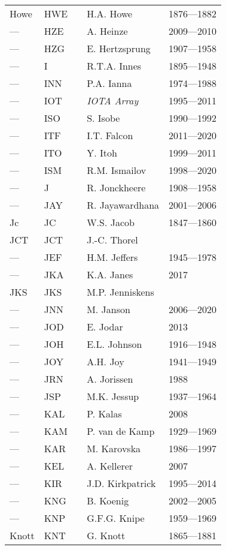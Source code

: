 \begin{longtable}{l|l|c|p{59mm}|l}
Howe & HWE &   & H.A. Howe & 1876---1882 \\
--- & HZE &   & A. Heinze & 2009---2010 \\
--- & HZG &   & E. Hertzsprung & 1907---1958 \\\midrule
--- & I   &   & R.T.A. Innes & 1895---1948 \\
--- & INN &   & P.A. Ianna & 1974---1988 \\
--- & IOT &   & \emph{IOTA Array} & 1995---2011 \\
--- & ISO &   & S. Isobe & 1990---1992 \\
--- & ITF &   & I.T. Falcon & 2011---2020 \\
--- & ITO &   & Y. Itoh & 1999---2011 \\
--- & ISM &   & R.M. Ismailov & 1998---2020 \\\midrule
--- & J   &   & R. Jonckheere & 1908---1958 \\
--- & JAY &   & R. Jayawardhana & 2001---2006 \\
Jc  & JC  &   & W.S. Jacob & 1847---1860 \\
JCT & JCT &   & J.-C. Thorel & \\
--- & JEF &   & H.M. Jeffers & 1945---1978 \\
--- & JKA &   & K.A. Janes & 2017 \\
JKS & JKS &   & M.P. Jenniskens & \\
--- & JNN &   & M. Janson & 2006---2020 \\
--- & JOD &   & E. Jodar & 2013 \\
--- & JOH &   & E.L. Johnson & 1916---1948 \\
--- & JOY &   & A.H. Joy & 1941---1949 \\
--- & JRN &   & A. Jorissen & 1988 \\
--- & JSP &   & M.K. Jessup & 1937---1964 \\\midrule
--- & KAL &   & P. Kalas & 2008 \\
--- & KAM &   & P. van de Kamp & 1929---1969 \\
--- & KAR &   & M. Karovska & 1986---1997 \\
--- & KEL &   & A. Kellerer & 2007 \\
--- & KIR &   & J.D. Kirkpatrick & 1995---2014 \\
--- & KNG &   & B. Koenig & 2002---2005 \\
--- & KNP &   & G.F.G. Knipe & 1959---1969 \\
Knott & KNT &   & G. Knott & 1865---1881 \\

\end{longtable}
